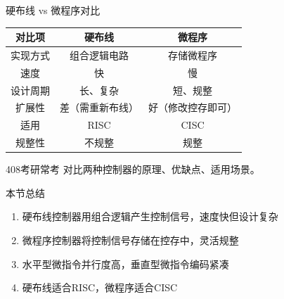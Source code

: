 \documentclass[10pt, aspectratio=169]{beamer}
\begin{document}
\begin{frame}{硬布线 vs 微程序对比}
    \begin{center}
        \begin{tabular}{|c|c|c|}
            \hline
            \textbf{对比项} & \textbf{硬布线} & \textbf{微程序} \\
            \hline
            实现方式 & 组合逻辑电路 & 存储微程序 \\
            速度 & 快 & 慢 \\
            设计周期 & 长、复杂 & 短、规整 \\
            扩展性 & 差（需重新布线） & 好（修改控存即可） \\
            适用 & RISC & CISC \\
            规整性 & 不规整 & 规整 \\
            \hline
        \end{tabular}
    \end{center}
    \vspace{0.5em}
    \begin{block}{408考研常考}
        对比两种控制器的原理、优缺点、适用场景。
    \end{block}
\end{frame}

\begin{frame}{本节总结}
    \begin{enumerate}
        \item 硬布线控制器用组合逻辑产生控制信号，速度快但设计复杂
        \item 微程序控制器将控制信号存储在控存中，灵活规整
        \item 水平型微指令并行度高，垂直型微指令编码紧凑
        \item 硬布线适合RISC，微程序适合CISC
    \end{enumerate}
\end{frame}
\end{document}
